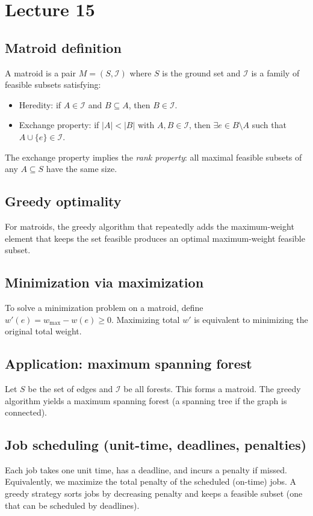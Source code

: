 \documentclass[11pt]{article}
\begin{document}
{{{{\section{Lecture 15}

\subsection*{Matroid definition}
A matroid is a pair $M=(S,\mathcal{I})$ where $S$ is the ground set and $\mathcal{I}$ is a family
of feasible subsets satisfying:
\begin{itemize}
\item Heredity: if $A \in \mathcal{I}$ and $B \subseteq A$, then $B \in \mathcal{I}$.
\item Exchange property: if $|A|<|B|$ with $A,B \in \mathcal{I}$, then $\exists e \in B\setminus A$
such that $A \cup \{e\} \in \mathcal{I}$.
\end{itemize}
The exchange property implies the \emph{rank property}: all maximal feasible subsets of any
$A \subseteq S$ have the same size.

\subsection*{Greedy optimality}
For matroids, the greedy algorithm that repeatedly adds the maximum-weight element that keeps the
set feasible produces an optimal maximum-weight feasible subset.

\subsection*{Minimization via maximization}
To solve a minimization problem on a matroid, define
\(w'(e) = w_{\max} - w(e) \ge 0\). Maximizing total $w'$ is equivalent to minimizing the original
total weight.

\subsection*{Application: maximum spanning forest}
Let $S$ be the set of edges and $\mathcal{I}$ be all forests. This forms a matroid. The greedy
algorithm yields a maximum spanning forest (a spanning tree if the graph is connected).

\subsection*{Job scheduling (unit-time, deadlines, penalties)}
Each job takes one unit time, has a deadline, and incurs a penalty if missed. Equivalently, we
maximize the total penalty of the scheduled (on-time) jobs. A greedy strategy sorts jobs by
decreasing penalty and keeps a feasible subset (one that can be scheduled by deadlines).

}}}}
\end{document}
